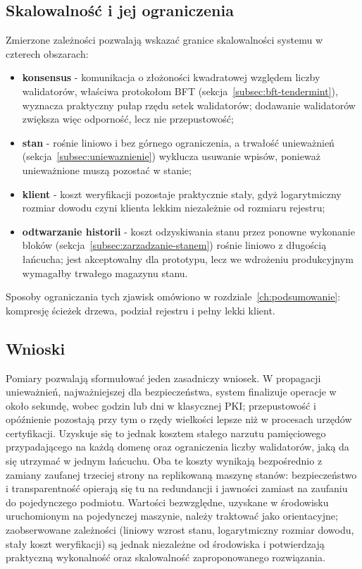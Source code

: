 \subsection{Skalowalność i jej ograniczenia}
\label{subsec:skalowalnosc}

Zmierzone zależności pozwalają wskazać granice skalowalności systemu w czterech obszarach:
\begin{itemize}
    \item \textbf{konsensus} - komunikacja o złożoności kwadratowej względem liczby walidatorów, właściwa protokołom BFT (sekcja~\ref{subsec:bft-tendermint}), wyznacza praktyczny pułap rzędu setek walidatorów; dodawanie walidatorów zwiększa więc odporność, lecz nie przepustowość;
    \item \textbf{stan} - rośnie liniowo i bez górnego ograniczenia, a trwałość unieważnień (sekcja~\ref{subsec:uniewaznienie}) wyklucza usuwanie wpisów, ponieważ unieważnione muszą pozostać w stanie;
    \item \textbf{klient} - koszt weryfikacji pozostaje praktycznie stały, gdyż logarytmiczny rozmiar dowodu czyni klienta lekkim niezależnie od rozmiaru rejestru;
    \item \textbf{odtwarzanie historii} - koszt odzyskiwania stanu przez ponowne wykonanie bloków (sekcja~\ref{subsec:zarzadzanie-stanem}) rośnie liniowo z długością łańcucha; jest akceptowalny dla prototypu, lecz we wdrożeniu produkcyjnym wymagałby trwałego magazynu stanu.
\end{itemize}

Sposoby ograniczania tych zjawisk omówiono w rozdziale~\ref{ch:podsumowanie}: kompresję ścieżek drzewa, podział rejestru i pełny lekki klient.

\subsection{Wnioski}
\label{subsec:wnioski-eksperymenty}

Pomiary pozwalają sformułować jeden zasadniczy wniosek. W propagacji unieważnień, najważniejszej dla bezpieczeństwa, system finalizuje operacje w około sekundę, wobec godzin lub dni w klasycznej PKI; przepustowość i opóźnienie pozostają przy tym o rzędy wielkości lepsze niż w procesach urzędów certyfikacji. Uzyskuje się to jednak kosztem stałego narzutu pamięciowego przypadającego na każdą domenę oraz ograniczenia liczby walidatorów, jaką da się utrzymać w jednym łańcuchu. Oba te koszty wynikają bezpośrednio z zamiany zaufanej trzeciej strony na replikowaną maszynę stanów: bezpieczeństwo i transparentność opierają się tu na redundancji i jawności zamiast na zaufaniu do pojedynczego podmiotu. Wartości bezwzględne, uzyskane w środowisku uruchomionym na pojedynczej maszynie, należy traktować jako orientacyjne; zaobserwowane zależności (liniowy wzrost stanu, logarytmiczny rozmiar dowodu, stały koszt weryfikacji) są jednak niezależne od środowiska i potwierdzają praktyczną wykonalność oraz skalowalność zaproponowanego rozwiązania.
